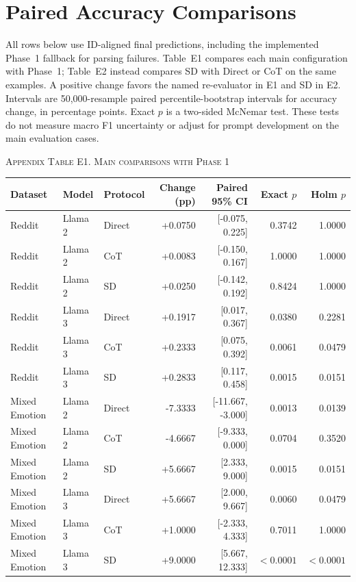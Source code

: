 \documentclass{ieeeaccess}
\begin{document}
\section{Paired Accuracy Comparisons}\label{app:statistics}
All rows below use ID-aligned final predictions, including the implemented Phase~1 fallback for parsing failures. Table~E1 compares each main configuration with Phase~1; Table~E2 instead compares SD with Direct or CoT on the same examples. A positive change favors the named re-evaluator in E1 and SD in E2. Intervals are 50,000-resample paired percentile-bootstrap intervals for accuracy change, in percentage points. Exact $p$ is a two-sided McNemar test. These tests do not measure macro F1 uncertainty or adjust for prompt development on the main evaluation cases.
\par\medskip\noindent\textsc{Appendix Table E1. Main comparisons with Phase 1}\par\smallskip
{\small\renewcommand{\arraystretch}{1.15}\noindent\begin{tabular*}{\textwidth}{@{\extracolsep{\fill}}lllrrrr@{}}\toprule
Dataset & Model & Protocol & Change (pp) & Paired 95\% CI & Exact $p$ & Holm $p$ \\\midrule
Reddit & Llama 2 & Direct & +0.0750 & [-0.075, 0.225] & 0.3742 & 1.0000 \\
Reddit & Llama 2 & CoT & +0.0083 & [-0.150, 0.167] & 1.0000 & 1.0000 \\
Reddit & Llama 2 & SD & +0.0250 & [-0.142, 0.192] & 0.8424 & 1.0000 \\
Reddit & Llama 3 & Direct & +0.1917 & [0.017, 0.367] & 0.0380 & 0.2281 \\
Reddit & Llama 3 & CoT & +0.2333 & [0.075, 0.392] & 0.0061 & 0.0479 \\
Reddit & Llama 3 & SD & +0.2833 & [0.117, 0.458] & 0.0015 & 0.0151 \\
Mixed Emotion & Llama 2 & Direct & -7.3333 & [-11.667, -3.000] & 0.0013 & 0.0139 \\
Mixed Emotion & Llama 2 & CoT & -4.6667 & [-9.333, 0.000] & 0.0704 & 0.3520 \\
Mixed Emotion & Llama 2 & SD & +5.6667 & [2.333, 9.000] & 0.0015 & 0.0151 \\
Mixed Emotion & Llama 3 & Direct & +5.6667 & [2.000, 9.667] & 0.0060 & 0.0479 \\
Mixed Emotion & Llama 3 & CoT & +1.0000 & [-2.333, 4.333] & 0.7011 & 1.0000 \\
Mixed Emotion & Llama 3 & SD & +9.0000 & [5.667, 12.333] & $<0.0001$ & $<0.0001$ \\
\bottomrule\end{tabular*}}\par\medskip
\end{document}
